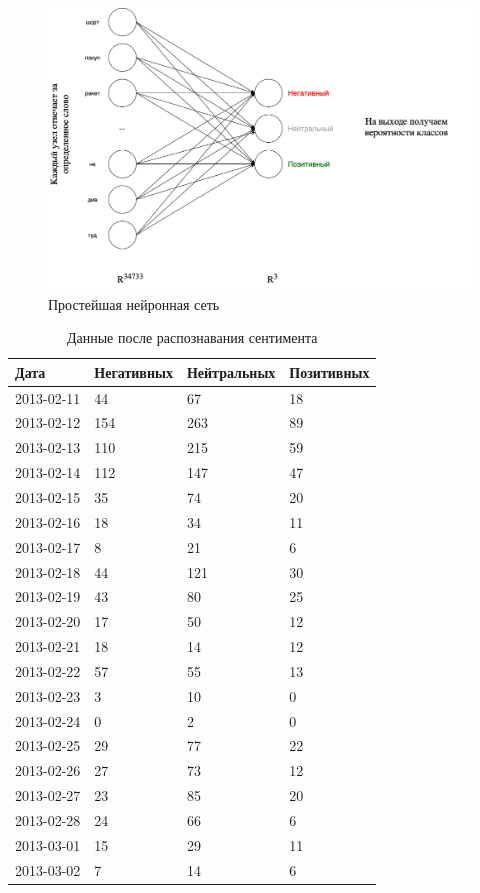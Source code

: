 \documentclass{article}
\begin{document}
\begin{figure}[!h]
	\centering
	\caption{Простейшая нейронная сеть}
	\includegraphics[scale=0.3]{nn.png}
\end{figure}


\begin{table}[!h]
	\caption{Данные после распознавания сентимента}
	\label{tab:table5}
	\centering
	\begin{tabular}{llll}
		\toprule
		Дата & Негативных & Нейтральных & Позитивных \\
		\midrule
		2013-02-11 & 44 & 67 & 18  \\ 
		2013-02-12 & 154 & 263 & 89  \\ 
		2013-02-13 & 110 & 215 & 59  \\ 
		2013-02-14 & 112 & 147 & 47  \\ 
		2013-02-15 & 35 & 74 & 20  \\ 
		2013-02-16 & 18 & 34 & 11  \\ 
		2013-02-17 & 8 & 21 & 6  \\ 
		2013-02-18 & 44 & 121 & 30  \\ 
		2013-02-19 & 43 & 80 & 25  \\ 
		2013-02-20 & 17 & 50 & 12  \\ 
		2013-02-21 & 18 & 14 & 12  \\ 
		2013-02-22 & 57 & 55 & 13  \\ 
		2013-02-23 & 3 & 10 & 0  \\ 
		2013-02-24 & 0 & 2 & 0  \\ 
		2013-02-25 & 29 & 77 & 22  \\ 
		2013-02-26 & 27 & 73 & 12  \\ 
		2013-02-27 & 23 & 85 & 20  \\ 
		2013-02-28 & 24 & 66 & 6  \\ 
		2013-03-01 & 15 & 29 & 11  \\ 
		2013-03-02 & 7 & 14 & 6  \\ 
		\bottomrule
	\end{tabular}
\end{table}
\end{document}
